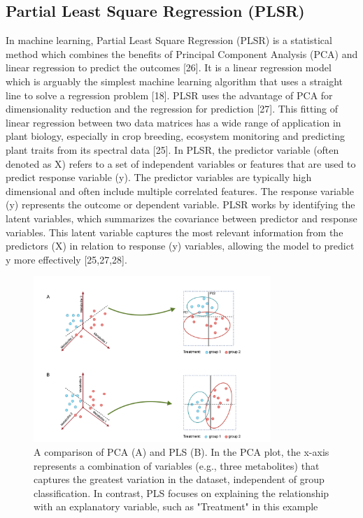 \documentclass[12pt,a4paper]{report}
\begin{document}
\subsection{Partial Least Square Regression (PLSR)}
In machine learning, Partial Least Square Regression (PLSR) is a statistical method which combines the benefits of Principal Component Analysis (PCA) and linear regression to predict the outcomes [26]. It is a linear regression model which is arguably the simplest machine learning algorithm that uses a straight line to solve a regression problem [18]. PLSR uses the advantage of PCA for dimensionality reduction and the regression for prediction [27].
This fitting of linear regression between two data matrices has a wide range of application in plant biology, especially in crop breeding, ecosystem monitoring and predicting plant traits from its spectral data [25]. In PLSR, the predictor variable (often denoted as X) refers to a set of independent 
variables or features that are used to predict response variable (y). The predictor variables are typically high dimensional and often include multiple correlated features. The response variable (y) represents the outcome or dependent variable. PLSR works by identifying the latent variables, which 
summarizes the covariance between predictor and response variables. This latent variable captures the most relevant information from the predictors (X) in relation to response (y) variables, allowing the model to predict y more effectively [25,27,28]. \\

\begin{figure}[h]
    \centering
    \includegraphics[width=0.8\textwidth]{Figures/PLSR.png}
    \caption{A comparison of PCA (A) and PLS (B). In the PCA plot, the x-axis represents a combination of variables (e.g., three metabolites) that captures the greatest variation in the dataset, independent of group classification. In contrast, PLS focuses on explaining the relationship with an explanatory variable, such as "Treatment" in this example}
    \label{fig:plsr}
\end{figure}
\end{document}
